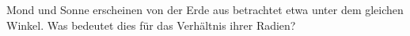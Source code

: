 Mond und Sonne erscheinen von der Erde aus betrachtet etwa unter dem gleichen Winkel. Was bedeutet dies für das Verhältnis ihrer Radien?
